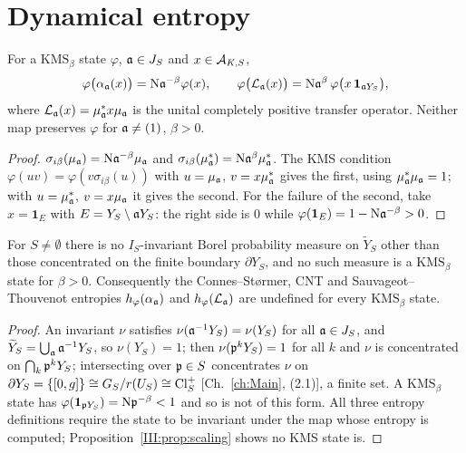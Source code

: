 \section{Dynamical entropy}\label{III:sec:entropy}

\begin{proposition}\label{III:prop:scaling}
For a $\mathrm{KMS}_\beta$ state $\varphi$, $\mathfrak{a}\in J_S$ and $x\in\mathcal{A}_{K,S}$,
\[
\varphi\bigl(\alpha_{\mathfrak{a}}(x)\bigr)=\mathrm{N}\mathfrak{a}^{-\beta}\varphi(x),
\qquad
\varphi\bigl(\mathcal{L}_{\mathfrak{a}}(x)\bigr)=\mathrm{N}\mathfrak{a}^{\beta}\,\varphi\bigl(x\,\mathbf 1_{\mathfrak{a} Y_S}\bigr),
\]
where $\mathcal{L}_{\mathfrak{a}}(x)=\mu_{\mathfrak{a}}^*x\mu_{\mathfrak{a}}$ is the unital completely positive transfer operator.
Neither map preserves $\varphi$ for $\mathfrak{a}\ne(1)$, $\beta>0$.
\end{proposition}

\begin{proof}
$\sigma_{i\beta}(\mu_{\mathfrak{a}})=\mathrm{N}\mathfrak{a}^{-\beta}\mu_{\mathfrak{a}}$ and
$\sigma_{i\beta}(\mu_{\mathfrak{a}}^*)=\mathrm{N}\mathfrak{a}^{\beta}\mu_{\mathfrak{a}}^*$. The KMS condition
$\varphi(uv)=\varphi(v\sigma_{i\beta}(u))$ with $u=\mu_{\mathfrak{a}}$, $v=x\mu_{\mathfrak{a}}^*$ gives the
first, using $\mu_{\mathfrak{a}}^*\mu_{\mathfrak{a}}=1$; with $u=\mu_{\mathfrak{a}}^*$, $v=x\mu_{\mathfrak{a}}$ it gives the second.
For the failure of the second, take $x=\mathbf 1_E$ with $E=Y_S\setminus\mathfrak{a} Y_S$: the right
side is $0$ while $\varphi(\mathbf 1_E)=1-\mathrm{N}\mathfrak{a}^{-\beta}>0$.
\end{proof}

\begin{theorem}\label{III:thm:noinv}
For $S\ne\emptyset$ there is no $I_S$-invariant Borel probability measure on
$\widetilde Y_S$ other than those concentrated on the finite boundary $\partial Y_S$, and no
such measure is a $\mathrm{KMS}_\beta$ state for $\beta>0$. Consequently the
Connes--St\o rmer, CNT and Sauvageot--Thouvenot entropies \cite{CS,CNT,ST}
$h_\varphi(\alpha_{\mathfrak{a}})$ and $h_\varphi(\mathcal{L}_{\mathfrak{a}})$ are undefined for every
$\mathrm{KMS}_\beta$ state.
\end{theorem}

\begin{proof}
An invariant $\nu$ satisfies $\nu(\mathfrak{a}^{-1}Y_S)=\nu(Y_S)$ for all $\mathfrak{a}\in J_S$, and
$\widetilde Y_S=\bigcup_{\mathfrak{a}}\mathfrak{a}^{-1}Y_S$, so $\nu(Y_S)=1$; then $\nu(\mathfrak{p}^kY_S)=1$ for all $k$
and $\nu$ is concentrated on $\bigcap_k\mathfrak{p}^kY_S$; intersecting over $\mathfrak{p}\in S$ concentrates
$\nu$ on $\partial Y_S=\{[0,g]\}\cong G_S/r(U_S)\cong\operatorname{Cl}^+_S$ [Ch.~\ref{ch:Main}, (2.1)], a finite
set. A
$\mathrm{KMS}_\beta$ state has $\varphi(\mathbf 1_{\mathfrak{p} Y_S})=\mathrm{N}\mathfrak{p}^{-\beta}<1$ and so is not
of this form. All three entropy definitions require the state to be invariant under the map
whose entropy is computed; Proposition~\ref{III:prop:scaling} shows no KMS state is.
\end{proof}

